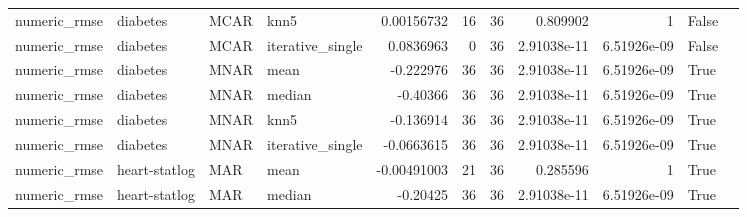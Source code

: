 \begin{table}[ht]
\begin{tabular}{llllrrrrrll}
 numeric\_rmse           & diabetes             & MCAR        & knn5             &      0.00156732  &                  16 &      36 & 0.809902    & 1           & False              &                                                                                                                    \\
 numeric\_rmse           & diabetes             & MCAR        & iterative\_single &      0.0836963   &                   0 &      36 & 2.91038e-11 & 6.51926e-09 & False              &                                                                                                                    \\
 numeric\_rmse           & diabetes             & MNAR        & mean             &     -0.222976    &                  36 &      36 & 2.91038e-11 & 6.51926e-09 & True               &                                                                                                                    \\
 numeric\_rmse           & diabetes             & MNAR        & median           &     -0.40366     &                  36 &      36 & 2.91038e-11 & 6.51926e-09 & True               &                                                                                                                    \\
 numeric\_rmse           & diabetes             & MNAR        & knn5             &     -0.136914    &                  36 &      36 & 2.91038e-11 & 6.51926e-09 & True               &                                                                                                                    \\
 numeric\_rmse           & diabetes             & MNAR        & iterative\_single &     -0.0663615   &                  36 &      36 & 2.91038e-11 & 6.51926e-09 & True               &                                                                                                                    \\
 numeric\_rmse           & heart-statlog        & MAR         & mean             &     -0.00491003  &                  21 &      36 & 0.285596    & 1           & True               &                                                                                                                    \\
 numeric\_rmse           & heart-statlog        & MAR         & median           &     -0.20425     &                  36 &      36 & 2.91038e-11 & 6.51926e-09 & True               &                                                                                                                    \\

\end{tabular}
\end{table}
